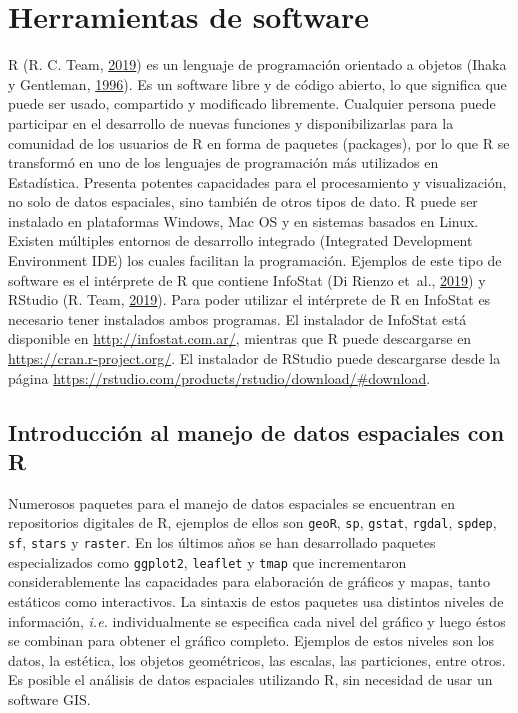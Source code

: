 \documentclass[11pt,b5paper,]{krantz}
\begin{document}
\hypertarget{herramientas-de-software}{%
\chapter{Herramientas de software}\label{herramientas-de-software}}

R (R. C. Team, \protect\hyperlink{ref-R_Core_Team_2019}{2019}) es un lenguaje de programación orientado a objetos (Ihaka y Gentleman, \protect\hyperlink{ref-Ihaka_Gentleman_1996}{1996}). Es un software libre y de código abierto, lo que significa que puede ser usado, compartido y modificado libremente. Cualquier persona puede participar en el desarrollo de nuevas funciones y disponibilizarlas para la comunidad de los usuarios de R en forma de paquetes (packages), por lo que R se transformó en uno de los lenguajes de programación más utilizados en Estadística. Presenta potentes capacidades para el procesamiento y visualización, no solo de datos espaciales, sino también de otros tipos de dato. R puede ser instalado en plataformas Windows, Mac OS y en sistemas basados en Linux. Existen múltiples entornos de desarrollo integrado (Integrated Development Environment IDE) los cuales facilitan la programación. Ejemplos de este tipo de software es el intérprete de R que contiene InfoStat (Di Rienzo et~al., \protect\hyperlink{ref-Di_Rienzo_Casanoves_Balzarini_Gonzalez_Tablada_Robledo_2019}{2019}) y RStudio (R. Team, \protect\hyperlink{ref-RStudio_Team_2019}{2019}). Para poder utilizar el intérprete de R en InfoStat es necesario tener instalados ambos programas. El instalador de InfoStat está disponible en \url{http://infostat.com.ar/}, mientras que R puede descargarse en \url{https://cran.r-project.org/}. El instalador de RStudio puede descargarse desde la página \url{https://rstudio.com/products/rstudio/download/\#download}.

\hypertarget{introducciuxf3n-al-manejo-de-datos-espaciales-con-r}{%
\section{Introducción al manejo de datos espaciales con R}\label{introducciuxf3n-al-manejo-de-datos-espaciales-con-r}}

Numerosos paquetes para el manejo de datos espaciales se encuentran en repositorios digitales de R, ejemplos de ellos son \texttt{geoR}, \texttt{sp}, \texttt{gstat}, \texttt{rgdal}, \texttt{spdep}, \texttt{sf}, \texttt{stars} y \texttt{raster}. En los últimos años se han desarrollado paquetes especializados como \texttt{ggplot2}, \texttt{leaflet} y \texttt{tmap} que incrementaron considerablemente las capacidades para elaboración de gráficos y mapas, tanto estáticos como interactivos. La sintaxis de estos paquetes usa distintos niveles de información, \emph{i.e.} individualmente se especifica cada nivel del gráfico y luego éstos se combinan para obtener el gráfico completo. Ejemplos de estos niveles son los datos, la estética, los objetos geométricos, las escalas, las particiones, entre otros. Es posible el análisis de datos espaciales utilizando R, sin necesidad de usar un software GIS.
\end{document}
